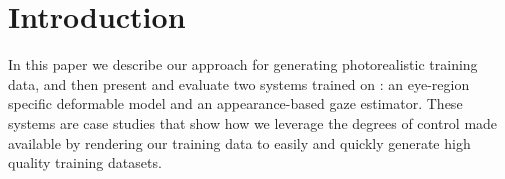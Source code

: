 
\section{Introduction}


In this paper we describe our approach for generating photorealistic training data, and then present and evaluate two systems trained on \dataset: an eye-region specific deformable model and an appearance-based gaze estimator. These systems are case studies that show how we leverage the degrees of control made available by rendering our training data to easily and quickly generate high quality training datasets.